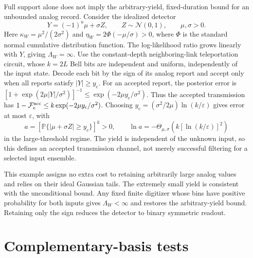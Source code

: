 \documentclass[aps,prl,twocolumn,superscriptaddress,longbibliography,reprint,floatfix]{revtex4-2}
\newcommand{\Prb}{\mathbb P}
\newcommand{\eps}{\varepsilon}
\newcommand{\Fe}{\mathcal F_{\mathrm e}}
\begin{document}
Full support alone does not imply the arbitrary-yield, fixed-duration
bound for an unbounded analog record. Consider the idealized detector
\begin{equation}
 Y=(-1)^u\mu+\sigma Z,\qquad Z\sim\mathcal N(0,1),
 \qquad \mu,\sigma>0 .
 \label{eq:analog-detector}
\end{equation}
Here $\kappa_W=\mu^2/(2\sigma^2)$ and $\eta_W=2\Phi(-\mu/\sigma)>0$,
where $\Phi$ is the standard normal cumulative distribution function.
The log-likelihood ratio grows linearly with $Y$, giving $\Lambda_W=\infty$. Use the constant-depth
neighboring-link teleportation circuit, whose $k=2L$ Bell bits are
independent and uniform, independently of the input state. Decode each
bit by the sign of its analog report and accept only when all reports
satisfy $|Y|\ge y_{\mathrm c}$. For an accepted report, the posterior error is
$[1+\exp(2\mu|Y|/\sigma^2)]^{-1}\le
\exp(-2\mu y_{\mathrm c}/\sigma^2)$. Thus the accepted transmission has
$1-\Fe^{\rm acc}\le k\exp(-2\mu y_{\mathrm c}/\sigma^2)$. Choosing
$y_{\mathrm c}=(\sigma^2/2\mu)\ln(k/\eps)$ gives error at most $\eps$, with
\begin{equation}
 a=\left[\Prb\{|\mu+\sigma Z|\ge y_{\mathrm c}\}\right]^k>0,
 \qquad
 \ln a=-\Theta_{\mu,\sigma}\!\left(
 k[\ln(k/\eps)]^2\right)
 \label{eq:analog-yield}
\end{equation}
in the large-threshold regime. The yield is independent of the unknown
input, so this defines an accepted transmission channel, not merely
successful filtering for a selected input ensemble.

This example assigns no extra cost to retaining arbitrarily large analog
values and relies on their ideal Gaussian tails. The extremely small yield is consistent with
the unconditional bound. Any fixed finite digitizer whose bins have
positive probability for both inputs gives $\Lambda_W<\infty$ and restores
the arbitrary-yield bound. Retaining only the sign reduces the detector
to binary symmetric readout.

\FloatBarrier
\section{Complementary-basis tests}
\end{document}

